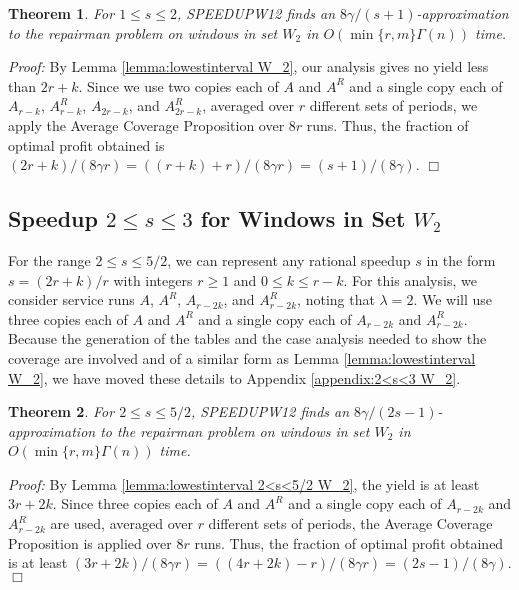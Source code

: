 \documentclass[11pt]{article}
\newtheorem{theorem}{Theorem}[section]
\newcommand\QED{\ifhmode\allowbreak\else\nobreak\fi
\quad\nobreak$\Box$\medbreak}
\newcommand{\proofstart}{\par\noindent \emph{Proof:} }
\newcommand{\proofend}{\QED\par}
\newenvironment{proof}{\proofstart}{\proofend}
\begin{document}
\begin{theorem}
For $1 \leq s \leq 2$, SPEEDUPW12 finds an $8\gamma/(s+1)$-approximation to the repairman problem on windows in set $W_2$ in $O(\min\{r, m\}\Gamma(n))$ time.
\end{theorem}

\begin{proof}
By Lemma \ref{lemma:lowestinterval W_2}, our analysis gives no yield less than $2r + k$.  Since we use two copies each of $A$ and $A^R$ and a single copy each of $A_{r - k}$, $A_{r - k}^R$, $A_{2r - k}$, and $A_{2r - k}^R$, averaged over $r$ different sets of periods, we apply the Average Coverage Proposition over $8r$ runs.  Thus, the fraction of optimal profit obtained is ${(2r + k)/( 8\gamma r)} = {((r + k) + r)/(8\gamma r)} = {(s + 1)/(8\gamma)}$.
\end{proof}

\subsection{Speedup $2 \leq s \leq 3$ for Windows in Set $W_2$}

For the range $2 \leq s \leq 5/2$, we can represent any rational speedup $s$ in the form $s = (2r + k)/r$ with integers $r \geq 1$ and $0 \leq k \leq r - k$.  For this analysis, we consider service runs $A$, $A^R$, $A_{r - 2k}$, and $A_{r - 2k}^R$, noting that $\lambda = 2$.  We will use three copies each of $A$ and $A^R$ and a single copy each of $A_{r - 2k}$ and $A_{r - 2k}^R$.  Because the generation of the tables and the case analysis needed to show the coverage are involved and of a similar form as Lemma \ref{lemma:lowestinterval W_2}, we have moved these details to Appendix \ref{appendix:2<s<3 W_2}.

\begin{theorem}
For $2 \leq s \leq 5/2$, SPEEDUPW12 finds an $8\gamma/(2s - 1)$-approximation to the repairman problem on windows in set $W_2$ in $O(\min\{r, m\}\Gamma(n))$ time.
\end{theorem}

\begin{proof}
By Lemma \ref{lemma:lowestinterval 2<s<5/2 W_2}, the yield is at least $3r + 2k$.  Since three copies each of $A$ and $A^R$ and a single copy each of $A_{r - 2k}$ and $A_{r - 2k}^R$ are used, averaged over $r$ different sets of periods, the Average Coverage Proposition is applied over $8r$ runs.  Thus, the fraction of optimal profit obtained is at least ${(3r + 2k)/(8\gamma r) } = {((4r + 2k) - r)/(8\gamma r)} = {(2s - 1)/(8\gamma)}$.
\end{proof}
\end{document}
